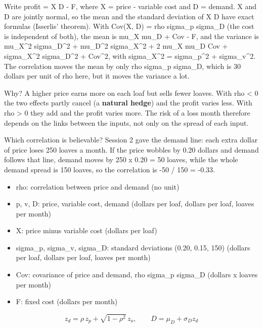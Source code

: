 \documentclass[11pt,a4paper]{article}
\begin{document}
Write profit = X D - F, where X = price - variable cost and D = demand. X and D are jointly normal, so the mean and the standard deviation of X D have exact formulas (Isserlis' theorem). With Cov(X, D) = rho sigma\_p sigma\_D (the cost is independent of both), the mean is mu\_X mu\_D + Cov - F, and the variance is mu\_X\textasciicircum{}2 sigma\_D\textasciicircum{}2 + mu\_D\textasciicircum{}2 sigma\_X\textasciicircum{}2 + 2 mu\_X mu\_D Cov + sigma\_X\textasciicircum{}2 sigma\_D\textasciicircum{}2 + Cov\textasciicircum{}2, with sigma\_X\textasciicircum{}2 = sigma\_p\textasciicircum{}2 + sigma\_v\textasciicircum{}2. The correlation moves the mean by only rho sigma\_p sigma\_D, which is 30 dollars per unit of rho here, but it moves the variance a lot.

Why? A higher price earns more on each loaf but sells fewer loaves. With rho \textless{} 0 the two effects partly cancel (a \textbf{natural hedge}) and the profit varies less. With rho \textgreater{} 0 they add and the profit varies more. The risk of a loss month therefore depends on the links between the inputs, not only on the spread of each input.

Which correlation is believable? Session 2 gave the demand line: each extra dollar of price loses 250 loaves a month. If the price wobbles by 0.20 dollars and demand follows that line, demand moves by 250 x 0.20 = 50 loaves, while the whole demand spread is 150 loaves, so the correlation is -50 / 150 = -0.33.

\begin{itemize}[nosep]
\item rho: correlation between price and demand (no unit)
\item p, v, D: price, variable cost, demand (dollars per loaf, dollars per loaf, loaves per month)
\item X: price minus variable cost (dollars per loaf)
\item sigma\_p, sigma\_v, sigma\_D: standard deviations (0.20, 0.15, 150) (dollars per loaf, dollars per loaf, loaves per month)
\item Cov: covariance of price and demand, rho sigma\_p sigma\_D (dollars x loaves per month)
\item F: fixed cost (dollars per month)
\end{itemize}

\begin{equation*}
z_d=\rho\,z_p+\sqrt{1-\rho^{2}}\,z_o,\qquad D=\mu_D+\sigma_D z_d
\end{equation*}
\end{document}
